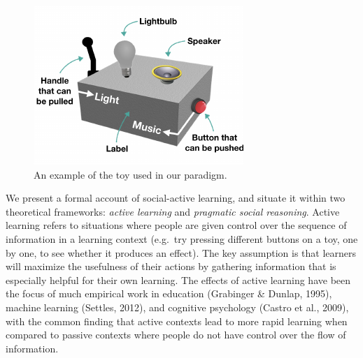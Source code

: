\documentclass[10pt, letterpaper]{article}
\newenvironment{CodeChunk}{}{}
\begin{document}
\begin{CodeChunk}
\captionsetup{width=0.8\columnwidth}\begin{figure}[b]

{\centering \includegraphics{figs/image-1} 

}

\caption[An example of the toy used in our paradigm]{An example of the toy used in our paradigm.}\label{fig:image}
\end{figure}
\end{CodeChunk}

We present a formal account of social-active learning, and situate it
within two theoretical frameworks: \emph{active learning} and
\emph{pragmatic social reasoning}. Active learning refers to situations
where people are given control over the sequence of information in a
learning context (e.g.~try pressing different buttons on a toy, one by
one, to see whether it produces an effect). The key assumption is that
learners will maximize the usefulness of their actions by gathering
information that is especially helpful for their own learning. The
effects of active learning have been the focus of much empirical work in
education (Grabinger \& Dunlap, 1995), machine learning (Settles, 2012),
and cognitive psychology (Castro et al., 2009), with the common finding
that active contexts lead to more rapid learning when compared to
passive contexts where people do not have control over the flow of
information.
\end{document}
